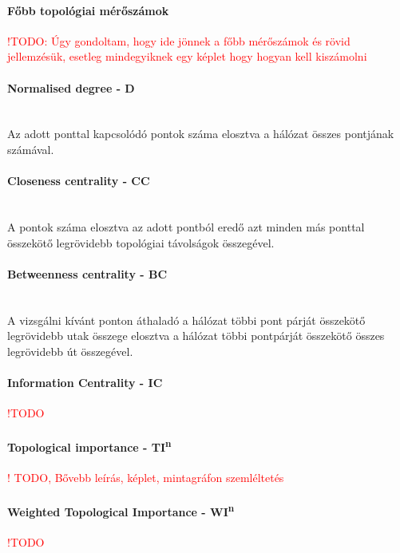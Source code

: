 \documentclass[a4paper,12pt]{article}
\begin{document}
	 \paragraph{Főbb topológiai mérőszámok}
	 
	 \textcolor{red}{ !TODO: Úgy gondoltam, hogy ide jönnek a főbb mérőszámok és rövid jellemzésük, esetleg mindegyiknek egy képlet hogy hogyan kell kiszámolni}
	 
	 \paragraph{Normalised degree - D} \mbox{}\\Az adott ponttal kapcsolódó pontok száma elosztva a hálózat összes pontjának számával. \cite{top_indexes}
	 
	 \paragraph{Closeness centrality - CC } \mbox{}\\ A pontok száma elosztva az adott pontból eredő azt minden más ponttal összekötő legrövidebb topológiai távolságok összegével. \cite{top_indexes}
	 
	 \paragraph{Betweenness centrality - BC} \mbox{}\\ A vizsgálni kívánt ponton áthaladó a hálózat többi pont párját összekötő legrövidebb utak összege elosztva a hálózat többi pontpárját összekötő összes legrövidebb út összegével. \cite{top_indexes}
	 
  	 \paragraph{Information Centrality - IC} \textcolor{red}{ !TODO}
	 
	 \paragraph{Topological importance - TI\textsuperscript{n}} \textcolor{red}{! TODO, Bővebb leírás, képlet, mintagráfon szemléltetés}
	 
 	 \paragraph{Weighted Topological Importance - WI\textsuperscript{n}} \textcolor{red}{ !TODO}
\end{document}

